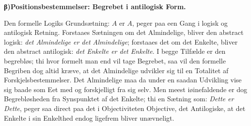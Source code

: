 \documentclass[12pt]{book}
\newcommand{\opage}[1]{\marginnote{\footnotesize\textit{[#1]}}}
\begin{document}
\begin{center}{\bfseries β)\quad Positionsbestemmelser: Begrebet i antilogisk Form.}\end{center}

Den formelle Logiks Grundsætning: $A$ er $A$, peger paa een Gang i logisk og antilogisk
Retning. Forstaaes Sætningen
\opage{156} om det Almindelige, bliver den abstract logisk: \emph{det Almindelige er det Almindelige};
forstaaes det om det Enkelte, bliver den abstract antilogisk: \emph{det Enkelte er det
Enkelte}. I begge Tilfælde er den begrebløs; thi hvor formelt man end vil tage Begrebet, saa
vil den formelle Begriben dog altid kræve, at det Almindelige udvikler sig til en Totalitet af
Forskjelsbestemmelser. Det Almindelige maa da under en saadan Udvikling vise sig baade som Eet
med og forskjelligt fra sig selv. Men meest iøinefaldende er dog Begrebløsheden fra
Synspunktet af det Enkelte; thi en Sætning som: \emph{Dette er Dette}, peger saa direct paa det
i Objectiviteten Objective, det Antilogiske, at det Enkelte i sin Enkelthed endog ligefrem
bliver unævneligt.
\end{document}
